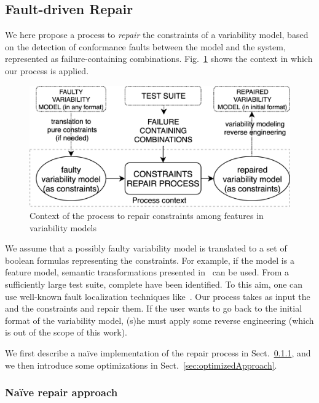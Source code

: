 \begin{tikzborder}{\cite{Gargantini16:validation}}
\begin{tikzborder}{\cite{gargantini_combinatorial_2017}}
\begin{tikzborder}{\cite{garn2019}}
\begin{tikzborder}{\cite{arcaini2019achieving}}
\begin{tikzborder}{\cite{arcaini2019varivolution}}
		\subsection{Fault-driven Repair}\label{sec:repair}
		
		\bb We here propose a process to {\it repair} the constraints of a variability model, based on the detection of conformance faults between the model and the system, represented as failure-containing combinations. Fig.~\ref{fig:splrepair} shows the context in which our process is applied. \be
		\begin{figure}[!ht]
			\centering
			\includegraphics[width=.8\columnwidth]{images/splrepair_new.png}
			\caption{Context of the process to repair constraints among features in variability models}
			\label{fig:splrepair}
		\end{figure}
		
		\bb We assume that a possibly faulty variability model is translated to a set of boolean formulas representing the constraints. For example, if the model is a feature model, semantic transformations presented in~\cite{batory2005feature} can be used. From a sufficiently large test suite, complete \fccs have been identified. To this aim, one can use well-known fault localization techniques like~\cite{ben_2015,iwct19}. Our process takes as input the \fccs and the constraints and repair them. If the user wants to go back to the initial format of the variability model, (s)he must apply some reverse engineering (which is out of the scope of this work).
		
		We first describe a na{\"i}ve implementation of the repair process in Sect.~\ref{sec:naiveAppr}, and we then introduce some optimizations in Sect.~\ref{sec:optimizedApproach}.
		\be
		
		\subsubsection{Na{\"i}ve repair approach}\label{sec:naiveAppr}
		

\end{tikzborder}
\end{tikzborder}
\end{tikzborder}
\end{tikzborder}
\end{tikzborder}
